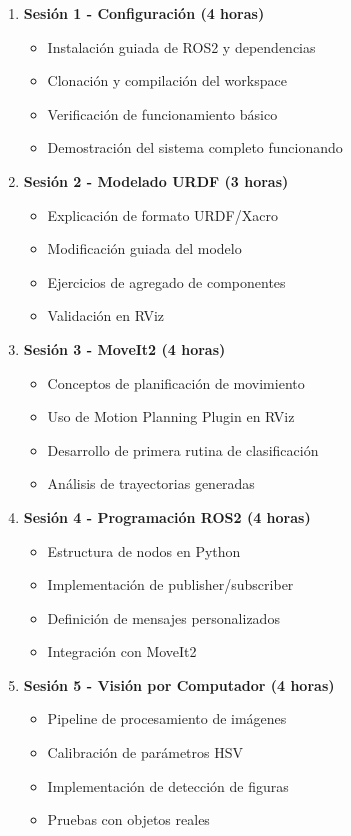 \begin{enumerate}
    \item \textbf{Sesión 1 - Configuración (4 horas)}
    \begin{itemize}
        \item Instalación guiada de ROS2 y dependencias
        \item Clonación y compilación del workspace
        \item Verificación de funcionamiento básico
        \item Demostración del sistema completo funcionando
    \end{itemize}
    
    \item \textbf{Sesión 2 - Modelado URDF (3 horas)}
    \begin{itemize}
        \item Explicación de formato URDF/Xacro
        \item Modificación guiada del modelo
        \item Ejercicios de agregado de componentes
        \item Validación en RViz
    \end{itemize}
    
    \item \textbf{Sesión 3 - MoveIt2 (4 horas)}
    \begin{itemize}
        \item Conceptos de planificación de movimiento
        \item Uso de Motion Planning Plugin en RViz
        \item Desarrollo de primera rutina de clasificación
        \item Análisis de trayectorias generadas
    \end{itemize}
    
    \item \textbf{Sesión 4 - Programación ROS2 (4 horas)}
    \begin{itemize}
        \item Estructura de nodos en Python
        \item Implementación de publisher/subscriber
        \item Definición de mensajes personalizados
        \item Integración con MoveIt2
    \end{itemize}
    
    \item \textbf{Sesión 5 - Visión por Computador (4 horas)}
    \begin{itemize}
        \item Pipeline de procesamiento de imágenes
        \item Calibración de parámetros HSV
        \item Implementación de detección de figuras
        \item Pruebas con objetos reales
    \end{itemize}
    

\end{enumerate}
